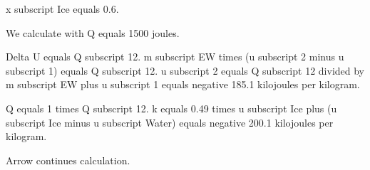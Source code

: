 x subscript Ice equals 0.6.  

We calculate with Q equals 1500 joules.  

Delta U equals Q subscript 12.  
m subscript EW times (u subscript 2 minus u subscript 1) equals Q subscript 12.  
u subscript 2 equals Q subscript 12 divided by m subscript EW plus u subscript 1 equals negative 185.1 kilojoules per kilogram.  

Q equals 1 times Q subscript 12.  
k equals 0.49 times u subscript Ice plus (u subscript Ice minus u subscript Water) equals negative 200.1 kilojoules per kilogram.  

Arrow continues calculation.